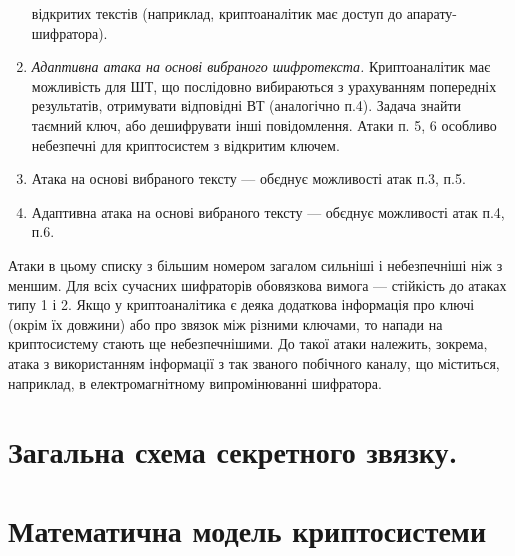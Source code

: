 \begin{enumerate}
відкритих текстів (наприклад, криптоаналітик має доступ до апарату-шифратора).
\item \textit{Адаптивна атака на основі вибраного шифротекста.} Криптоаналітик
має можливість для ШТ, що послідовно вибираються з урахуванням попередніх
результатів,  отримувати відповідні ВТ (аналогічно п.4). Задача знайти таємний
ключ, або дешифрувати інші повідомлення. Атаки п. 5, 6 особливо небезпечні для
криптосистем з відкритим ключем.
\item Атака на основі вибраного тексту  --- об{\textquotesingle}єднує можливості
атак п.3, п.5.
\item Адаптивна атака на основі вибраного тексту  --- об{\textquotesingle}єднує
можливості атак п.4, п.6.
\end{enumerate}

\bigskip

 Атаки в цьому списку з більшим номером загалом сильніші і небезпечніші  ніж з
меншим. Для всіх сучасних шифраторів обов{\textquotesingle}язкова вимога ---
стійкість до атаках типу 1 і 2. Якщо у криптоаналітика є деяка додаткова
інформація про ключі (окрім їх довжини) або про зв{\textquotesingle}язок між
різними ключами, то напади на криптосистему  стають ще небезпечнішими. До такої
атаки належить, зокрема, атака з використанням інформації з так званого
побічного каналу, що міститься, наприклад, в електромагнітному випромінюванні
шифратора.


\bigskip


\bigskip

\section{Загальна схема секретного зв{\textquotesingle}язку.}

\section{Математична модель криптосистеми}


\bigskip


\bigskip


